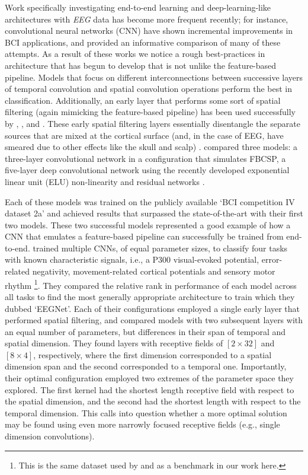 \documentclass[utf8]{frontiersSCNS} %
\begin{document}
Work specifically investigating end-to-end learning and deep-learning-like architectures with \emph{EEG} data has become more frequent recently; for instance, convolutional neural networks (CNN) have shown incremental improvements in BCI applications, and \cite{Schirrmeister2017} provided an informative comparison of many of these attempts. As a result of these works we notice a rough best-practices in architecture that has begun to develop that is not unlike the feature-based pipeline. Models that focus on different interconnections between successive layers of temporal convolution and spatial convolution operations perform the best in classification. Additionally, an early layer that performs some sort of spatial filtering (again mimicking the feature-based pipeline) has been used successfully by \cite{Lawhern2017}, \cite{Sun}, and \cite{Schirrmeister2017}. These early spatial filtering layers essentially disentangle the separate sources that are mixed at the cortical surface (and, in the case of EEG, have smeared due to other effects like the skull and scalp) \cite{ElectricFieldsOfTheBrain_ch5and6}. \cite{Schirrmeister2017} compared three models: a three-layer convolutional network in a configuration that simulates FBCSP, a five-layer deep convolutional network using the recently developed exponential linear unit (ELU) non-linearity \cite{Clevert} and residual networks \cite{He2015a}.

Each of these models was trained on the publicly available `BCI competition IV dataset 2a' and achieved results that surpassed the state-of-the-art with their first two models. These two successful models represented a good example of how a CNN that emulates a feature-based pipeline can successfully be trained from end-to-end. \cite{Lawhern2017} trained multiple CNNs, of equal parameter sizes, to classify four tasks with known characteristic signals, i.e., a P300 visual-evoked potential, error-related negativity, movement-related cortical potentials and sensory motor rhythm \footnote{This is the same dataset used by \cite{Schirrmeister2017} and as a benchmark in our work here.}. They compared the relative rank in performance of each model across all tasks to find the most generally appropriate architecture to train which they dubbed `EEGNet'. Each of their configurations employed a single early layer that performed spatial filtering, and compared models with two subsequent layers with an equal number of parameters, but differences in their span of temporal and spatial dimension. They found layers with receptive fields of $[2 \times 32]$ and $[8 \times 4]$, respectively, where the first dimension corresponded to a spatial dimension span and the second corresponded to a temporal one. Importantly, their optimal configuration employed two extremes of the parameter space they explored. The first kernel had the shortest length receptive field with respect to the spatial dimension, and the second had the shortest length with respect to the temporal dimension. This calls into question whether a more optimal solution may be found using even more narrowly focused receptive fields (e.g., single dimension convolutions).
\end{document}
